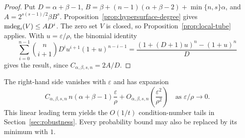 \begin{proof}
Put $D=\alpha+\beta-1$, $B=\beta+(n-1)(\alpha+\beta-2)+\min\{n,s\}\alpha$, and $A=2^{s(s-1)/2}\beta B^s$. Proposition~\ref{prop:hypersurface-degree} gives $\operatorname{\mathrm{mdeg}}_i(V)\le AD^i$. The zero set $V$ is closed, so Proposition~\ref{prop:local-tube} applies. With $u=\varepsilon/\rho$, the binomial identity
\[
\sum_{i=0}^{n-1}\binom n{i+1}D^i u^{i+1}(1+u)^{n-i-1}
=\frac{(1+(D+1)u)^n-(1+u)^n}{D}
\]
gives the result, since $C_{\alpha,\beta,s,n}=2A/D$.
\end{proof}

\begin{remark}\label{rem:prob_bound_simple}
The right-hand side vanishes with $\varepsilon$ and has expansion
\[
C_{\alpha,\beta,s,n}\,n(\alpha+\beta-1)\frac{\varepsilon}{\rho}
+O_{\alpha,\beta,s,n}\!\left(\frac{\varepsilon^2}{\rho^2}\right)
\quad\text{as }\varepsilon/\rho\to0.
\]
This linear leading term yields the $O(1/t)$ condition-number tails in Section~\ref{sec:robustness}. Every probability bound may also be replaced by its minimum with $1$.
\end{remark}
